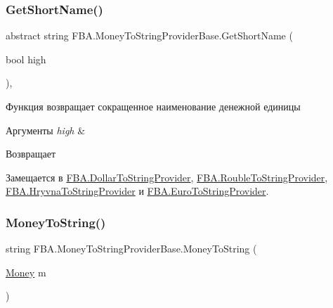\subsubsection{\texorpdfstring{Get\+Short\+Name()}{GetShortName()}}
{\footnotesize\ttfamily abstract string F\+B\+A.\+Money\+To\+String\+Provider\+Base.\+Get\+Short\+Name (\begin{DoxyParamCaption}\item[{bool}]{high }\end{DoxyParamCaption})\hspace{0.3cm}{\ttfamily [protected]}, {}}



Функция возвращает сокращенное наименование денежной единицы 


\begin{DoxyParams}{Аргументы}
{\em high} & \\
\hline
\end{DoxyParams}
\begin{DoxyReturn}{Возвращает}

\end{DoxyReturn}


Замещается в \mbox{\hyperlink{class_f_b_a_1_1_dollar_to_string_provider_a3da0b133efc7076214481a3c85819cde}{F\+B\+A.\+Dollar\+To\+String\+Provider}}, \mbox{\hyperlink{class_f_b_a_1_1_rouble_to_string_provider_ab07e18dc82b66cbd58a7bcbd4a049c5f}{F\+B\+A.\+Rouble\+To\+String\+Provider}}, \mbox{\hyperlink{class_f_b_a_1_1_hryvna_to_string_provider_a6c6ffa9793f9d6ca8ee4b2fdc401e36a}{F\+B\+A.\+Hryvna\+To\+String\+Provider}} и \mbox{\hyperlink{class_f_b_a_1_1_euro_to_string_provider_a86d24c3da503faee3603d111a65228ea}{F\+B\+A.\+Euro\+To\+String\+Provider}}.

\mbox{\label{class_f_b_a_1_1_money_to_string_provider_base_ac980731799d741d463f089b89e2534ab}} 
\subsubsection{\texorpdfstring{Money\+To\+String()}{MoneyToString()}}
{\footnotesize\ttfamily string F\+B\+A.\+Money\+To\+String\+Provider\+Base.\+Money\+To\+String (\begin{DoxyParamCaption}\item[{\mbox{\hyperlink{struct_f_b_a_1_1_money}{Money}}}]{m }\end{DoxyParamCaption})}



